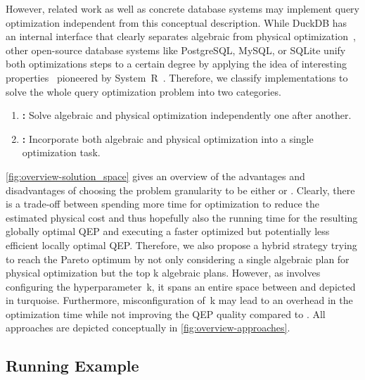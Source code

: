 However, related work as well as concrete database systems may implement query optimization independent from this conceptual description.  While DuckDB has an internal interface that clearly separates algebraic from physical optimization~\cite{duckdb}, other open-source database systems like PostgreSQL, MySQL, or SQLite unify both optimizations steps to a certain degree by applying the idea of interesting properties~\cite{interesting_orders, interesting_orders_impl, interesting_orders_and_groupings, interesting_orders_and_groupings_impl} pioneered by System~R~\cite{access_path_selection}.  Therefore, we classify implementations to solve the whole query optimization problem into two categories.
\begin{enumerate}[label=\textbf{(\arabic*)}, leftmargin=.6cm]
    \item \textbf{\split:} Solve algebraic and physical optimization independently one after another.
    \item \textbf{\holistic:} Incorporate both algebraic and physical optimization into a single optimization task.
\end{enumerate}

\autoref{fig:overview-solution_space} gives an overview of the advantages and disadvantages of choosing the problem granularity to be either \split or \holistic.  Clearly, there is a trade-off between spending more time for optimization to reduce the estimated physical cost and thus hopefully also the running time for the resulting globally optimal QEP and executing a faster optimized but potentially less efficient locally optimal QEP.  Therefore, we also propose a hybrid strategy \topk trying to reach the Pareto optimum by not only considering a single algebraic plan for physical optimization but the top k algebraic plans.  However, as \topk involves configuring the hyperparameter~k, it spans an entire space between \split and \holistic depicted in turquoise.  Furthermore, misconfiguration of~k may lead to an overhead in the optimization time while not improving the QEP quality compared to \holistic.  All approaches are depicted conceptually in \autoref{fig:overview-approaches}.

\subsection{Running Example}
\label{sec:example}

